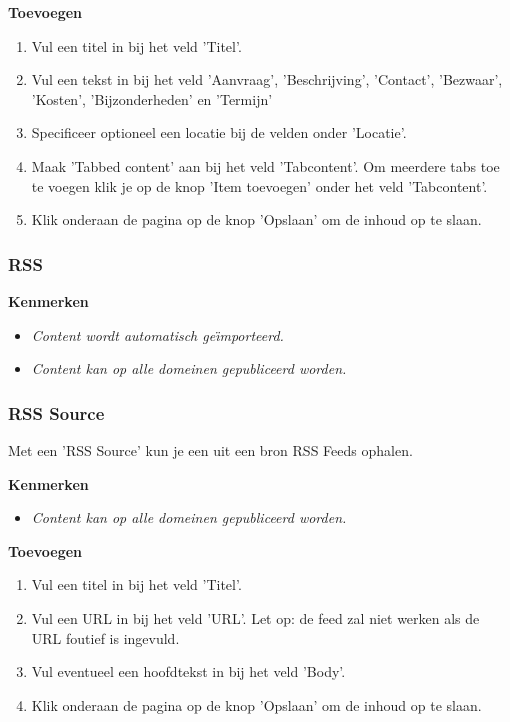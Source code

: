 \textbf{Toevoegen}

\begin{enumerate}
\item Vul een titel in bij het veld 'Titel'.
\item Vul een tekst in bij het veld 'Aanvraag', 'Beschrijving', 'Contact', 'Bezwaar', 'Kosten', 'Bijzonderheden' en 'Termijn'
\item Specificeer optioneel een locatie bij de velden onder 'Locatie'.
\item Maak 'Tabbed content' aan bij het veld 'Tabcontent'. Om meerdere tabs toe te voegen klik je op de knop 'Item toevoegen' onder het veld 'Tabcontent'.
\item Klik onderaan de pagina op de knop 'Opslaan' om de inhoud op te slaan.
\end{enumerate}

\subsubsection{RSS}\label{rss}

\textbf{Kenmerken}

\begin{itemize}
\item \emph{Content wordt automatisch ge{\"\i}mporteerd.}
\item \emph{Content kan op alle domeinen gepubliceerd worden.}
\end{itemize}

\subsubsection{RSS Source}\label{rsssource}
Met een 'RSS Source' kun je een uit een bron RSS Feeds ophalen.

\textbf{Kenmerken}

\begin{itemize}
\item \emph{Content kan op alle domeinen gepubliceerd worden.}
\end{itemize}

\textbf{Toevoegen}

\begin{enumerate}
\item Vul een titel in bij het veld 'Titel'.
\item Vul een URL in bij het veld 'URL'. Let op: de feed zal niet werken als de URL foutief is ingevuld.
\item Vul eventueel een hoofdtekst in bij het veld 'Body'.
\item Klik onderaan de pagina op de knop 'Opslaan' om de inhoud op te slaan.
\end{enumerate}

